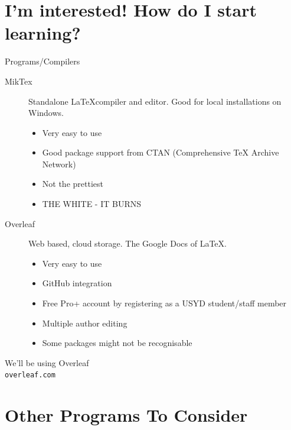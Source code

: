 \documentclass[10pt]{beamer}
\begin{document}
\section{I'm interested! How do I start learning?}
\begin{frame}{Programs/Compilers}
\begin{description}
\item[MikTex] Standalone \LaTeX compiler and editor. Good for local installations on Windows.
\begin{itemize}
\item Very easy to use
\item Good package support from CTAN (Comprehensive TeX Archive Network)
\item Not the prettiest
\item THE WHITE - IT BURNS
\end{itemize}
\item[Overleaf] Web based, cloud storage. The \alert{Google Docs} of \LaTeX.
\begin{itemize}
\item Very easy to use
\item GitHub integration
\item Free Pro+ account by registering as a USYD student/staff member
\item Multiple author editing
\item Some packages might not be recognisable
\end{itemize}
\end{description}
\end{frame}
\begin{frame}
  \centering
We'll be using \alert{Overleaf}\\
\texttt{overleaf.com}
\end{frame}
\section{Other Programs To Consider}
\end{document}

